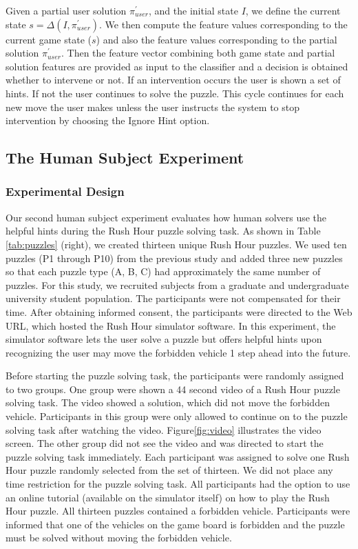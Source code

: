 \documentclass[doctor]{thesis} %
\theoremstyle{plain}
\begin{document}
Given a partial user solution $\pi^\prime _{user}$, and the initial state $I$, we define the current state $s = \Delta (I,\pi^\prime _{user})$. We then compute the feature values corresponding to the current game state ($s$) and also the feature values corresponding to the partial solution $\pi^\prime _{user}$. Then the feature vector combining both game state and partial solution features are provided as input to the classifier and a decision is obtained whether to intervene or not. If an intervention occurs the user is shown a set of hints. If not the user continues to solve the puzzle. This cycle continues for each new move the user makes unless the user instructs the system to stop intervention by choosing the Ignore Hint option.

\subsection*{The Human Subject Experiment}
\subsubsection*{Experimental Design}
Our second human subject experiment evaluates how human solvers use the helpful hints during the Rush Hour puzzle solving task. As shown in Table \ref{tab:puzzles} (right), we created thirteen unique Rush Hour puzzles. We used ten puzzles (P1 through P10) from the previous study and added three new puzzles so that each puzzle type (A, B, C) had approximately the same number of puzzles. For this study, we recruited subjects from a graduate and undergraduate university student population. The participants were not compensated for their time. After obtaining informed consent, the participants were directed to the Web URL, which hosted the Rush Hour simulator software. In this experiment, the simulator software lets the user solve a puzzle but offers helpful hints upon recognizing the user may move the forbidden vehicle 1 step ahead into the future.

Before starting the puzzle solving task, the participants were randomly assigned to two groups. One group were shown a 44 second video of a Rush Hour puzzle solving task. The video showed a solution, which did not move the forbidden vehicle. Participants in this group were only allowed to continue on to the puzzle solving task after watching the video. Figure\ref{fig:video} illustrates the video screen. The other group did not see the video and was directed to start the puzzle solving task immediately. Each participant was assigned to solve one Rush Hour puzzle randomly selected from the set of thirteen. We did not place any time restriction for the puzzle solving task. All participants had the option to use an online tutorial (available on the simulator itself) on how to play the Rush Hour puzzle. All thirteen puzzles contained a forbidden vehicle. Participants were informed that one of the vehicles on the game board is forbidden and the puzzle must be solved without moving the forbidden vehicle. 
\end{document}
